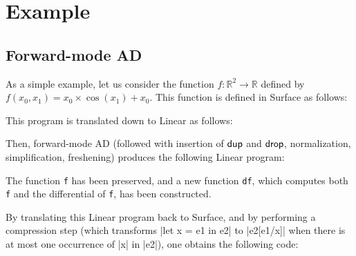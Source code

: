 \documentclass{article}
\begin{document}

\section{Example}
\label{sec:example}

\subsection{Forward-mode AD}
\label{sec:example:fmad}

As a simple example, let us consider the function $f : \mathbb{R}^2 \rightarrow
\mathbb{R}$ defined by $f(x_0, x_1) = x_0\times\cos(x_1)+x_0$.
%
This function is defined in Surface as follows:

\lstset{rangeprefix=(*\ ,rangesuffix=\ *),includerangemarker=false}
\begin{mdframed}[backgroundcolor=gray!10,linewidth=0pt]

\end{mdframed}

This program is translated down to Linear as follows:

\begin{mdframed}[backgroundcolor=gray!10,linewidth=0pt]

\end{mdframed}

Then, forward-mode AD (followed with insertion of $\mathsf{dup}$ and
$\mathsf{drop}$, normalization, simplification, freshening) produces the
following Linear program:

\begin{mdframed}[backgroundcolor=gray!10,linewidth=0pt]

\end{mdframed}

The function \texttt{f} has been preserved, and a new function \texttt{df},
which computes both \texttt{f} and the differential of \texttt{f}, has been
constructed.

By translating this Linear program back to Surface,
and by performing a compression step
(which transforms \oc|let x = e1 in e2| to \oc|e2[e1/x]|
 when there is at most one occurrence of \oc|x| in \oc|e2|),
one obtains the following code:

\begin{mdframed}[backgroundcolor=gray!10,linewidth=0pt]

\end{mdframed}
\end{document}

